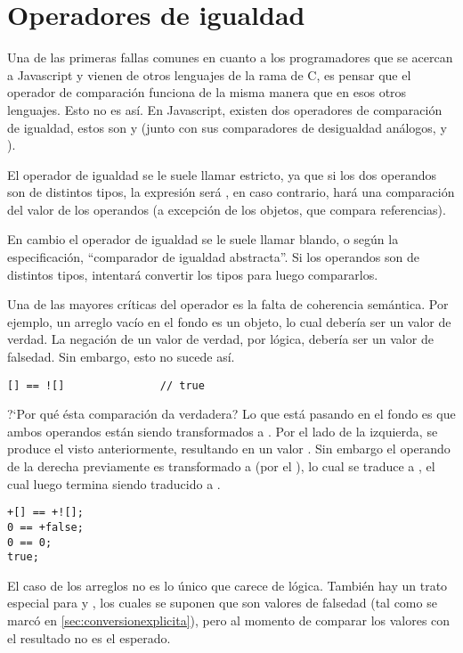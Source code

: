 \section{Operadores de igualdad}
\label{sec:eqeqeq}

Una de las primeras fallas comunes en cuanto a los programadores que se acercan a Javascript y vienen de otros lenguajes de la rama de C, es pensar que el operador de comparación \code{==} funciona de la misma manera que en esos otros lenguajes. Esto no es así. En Javascript, existen dos operadores de comparación de igualdad, estos son \code{==} y \code{===} (junto con sus comparadores de desigualdad análogos, \code{!=} y \code{!==}).

El operador de igualdad \code{===} se le suele llamar estricto, ya que si los dos operandos son de distintos tipos, la expresión será , en caso contrario, hará una comparación del valor de los operandos (a excepción de los objetos, que compara referencias).

En cambio el operador de igualdad \code{==} se le suele llamar blando, o según la especificación, "`comparador de igualdad abstracta"'. Si los operandos son de distintos tipos, intentará convertir los tipos para luego compararlos.

Una de las mayores críticas del operador \code{==} es la falta de coherencia semántica. Por ejemplo, un arreglo vacío \code{[]} en el fondo es un objeto, lo cual debería ser un valor de verdad. La negación de un valor de verdad, por lógica, debería ser un valor de falsedad. Sin embargo, esto no sucede así.

\begin{lstlisting}[title={Comparando un \code{Array} con su negación}]
[] == ![] 				// true
\end{lstlisting}

?`Por qué ésta comparación da verdadera? Lo que está pasando en el fondo es que ambos operandos están siendo transformados a . Por el lado de la izquierda, se produce el  visto anteriormente, resultando en un valor . Sin embargo el operando de la derecha previamente es transformado a  (por el ), lo cual se traduce a , el cual luego termina siendo traducido a .

\begin{lstlisting}
+[] == +![];
0 == +false;
0 == 0;
true;
\end{lstlisting}

El caso de los arreglos no es lo único que carece de lógica. También hay un trato especial para  y , los cuales se suponen que son valores de falsedad (tal como se marcó en \ref{sec:conversionexplicita}), pero al momento de comparar los valores con  el resultado no es el esperado.

